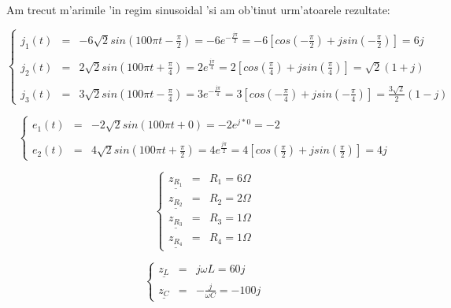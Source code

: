 \documentclass[titlepage, a4paper,12pt]{article}
\begin{document}
Am trecut m'arimile 'in regim sinusoidal 'si am ob'tinut urm'atoarele rezultate:


\begin{equation}
\left\{
\begin{array}{ccl}
j_1(t) & = & -6\sqrt{2}sin(100\pi t - \frac{\pi}{2}) = -6e^{-\frac{j\pi}{2}} = -6[cos({-\frac{\pi}{2}}) + jsin({-\frac{\pi}{2}})] = 6j \\ \\
j_2(t) & = & 2\sqrt{2}sin(100\pi t + \frac{\pi}{4}) = 2e^{\frac{j\pi}{4}} = 2[cos({\frac{\pi}{4}}) + jsin({\frac{\pi}{4}})] = \sqrt{2}(1 + j) \\ \\
j_3(t) & = & 3\sqrt{2}sin(100\pi t - \frac{\pi}{4}) = 3e^{-\frac{j\pi}{4}} = 3[cos({-\frac{\pi}{4}}) + jsin({-\frac{\pi}{4}})] = \frac{3\sqrt{2}}{2}(1 - j)
\end{array}  
\right. \nonumber %
\end{equation}

\begin{equation}
\left\{
\begin{array}{ccl}
e_1(t) & = & -2\sqrt{2}sin(100\pi t + 0) = -2e^{j*0} = -2 \\ \\
e_2(t) & = & 4\sqrt{2}sin(100\pi t + \frac{\pi}{2}) = 4e^{\frac{j\pi}{2}} = 4[cos({\frac{\pi}{2}}) + jsin({\frac{\pi}{2}})] = 4j
\end{array}  
\right. \nonumber %
\end{equation}


\begin{equation}
\left\{
\begin{array}{ccl}
\underline{z_{R_1}} & = & R_1 = 6\Omega \\
\underline{z_{R_2}} & = & R_2 = 2\Omega\\
\underline{z_{R_3}} & = & R_3 = 1\Omega \\
\underline{z_{R_4}} & = & R_4 = 1\Omega
\end{array}  
\right. \nonumber %
\end{equation}


\begin{equation}
\left\{
\begin{array}{ccl}
\underline{z_{L}} & = & j\omega L = 60j \\
\underline{z_{C}} & = & -\frac{j}{\omega C} = -100j
\end{array}  
\right. \nonumber %
\end{equation} \\
\end{document}
